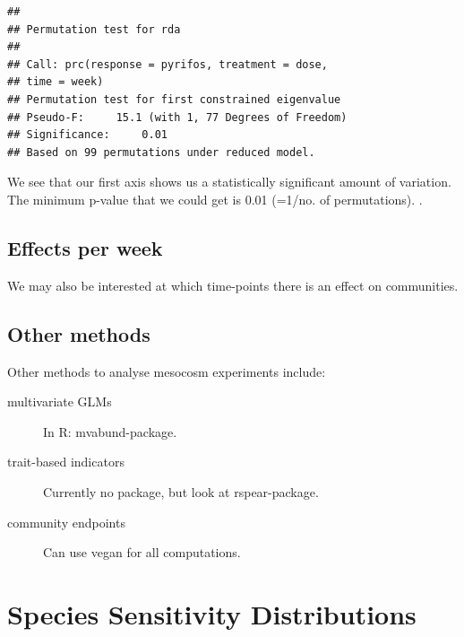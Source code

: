 \documentclass{tufte-book}\usepackage{knitr}
\begin{document}
\begin{knitrout}
\color{fgcolor}\begin{kframe}
\begin{alltt}
 \hlkwb{<-}   
     \hlstd{=} \hlstd{)}
\end{alltt}
\begin{verbatim}
## 
## Permutation test for rda 
## 
## Call: prc(response = pyrifos, treatment = dose,
## time = week)
## Permutation test for first constrained eigenvalue
## Pseudo-F:	 15.1 (with 1, 77 Degrees of Freedom)
## Significance:	 0.01 
## Based on 99 permutations under reduced model.
\end{verbatim}
\end{kframe}
\end{knitrout}


We see that our first axis shows us a statistically significant amount of variation. 
The minimum p-value that we could get is 0.01 (=1/no. of permutations).
.

\subsection{Effects per week}

We may also be interested at which time-points there is an effect on communities.


\subsection{Other methods}

Other methods to analyse mesocosm experiments include:

\begin{description}
  \item[multivariate GLMs]{\cite{warton_distance-based_2011, wang_mvabund-_2012} In R: mvabund-package.}
  \item[trait-based indicators]{\cite{liess_traits_2011} Currently no package, but look at rspear-package.}
  \item[community endpoints]{\cite{sanchez-bayo_evaluation_2012} Can use vegan for all computations.}
\end{description}




\section{Species Sensitivity Distributions}
\begin{knitrout}
\color{fgcolor}\begin{kframe}
\begin{alltt}
\end{alltt}
\end{kframe}
\end{knitrout}
\end{document}
